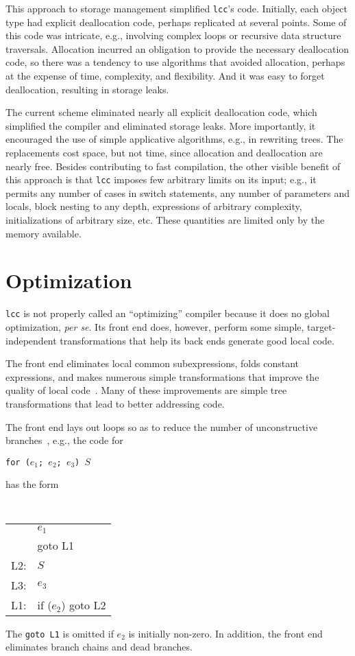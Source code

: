 This approach to storage management simplified \verb|lcc|'s code.
Initially, each object type had explicit deallocation code, perhaps
replicated at several points. Some of this code was intricate, e.g.,
involving complex loops or recursive data structure traversals.
Allocation incurred an obligation to provide the necessary
deallocation code, so there was a tendency to use
algorithms that avoided allocation,
perhaps at the expense of time, complexity, and flexibility.
And it was easy to forget deallocation, resulting in storage leaks.

The current scheme eliminated nearly all explicit deallocation code,
which simplified the compiler and eliminated storage leaks.
More importantly, it encouraged the use of simple applicative algorithms,
e.g., in rewriting trees.
The replacements cost space, but not time, since
allocation and deallocation are nearly free.
Besides contributing to fast compilation, the other visible
benefit of this approach is that \verb|lcc| imposes few
arbitrary limits on its input; e.g., it permits
any number of cases in switch statements,
any number of parameters and locals, block nesting to any depth,
expressions of arbitrary complexity, initializations of arbitrary size, etc.
These quantities are limited only by the memory available.


\section{Optimization}

\verb|lcc| is not properly called an ``optimizing'' compiler
because it does no global optimization, {\em per se}.
Its front end does, however, perform some simple, target-independent
transformations that help its back ends generate good local code.

The front end eliminates local common subexpressions,
folds constant expressions, and makes numerous simple
transformations that improve the quality of local code~\cite{hanson83}.
Many of these improvements are simple tree transformations
that lead to better addressing code.

The front end lays out loops so as to reduce the number
of unconstructive branches~\cite{baskett78}, e.g., the code for
\begin{flushleft}
\tt for ($e_1$; $e_2$; $e_3$) $S$
\end{flushleft}
has the form
\begin{flushleft}\tt
\begin{tabular}{ll}
	& $e_1$ \\
	& goto L1 \\
L2:	& $S$ \\
L3:	& $e_3$ \\
L1:	& if ($e_2$) goto L2 \\
\end{tabular}
\end{flushleft}
The \verb|goto L1| is omitted if $e_2$ is initially non-zero.
In addition, the front end eliminates branch chains and dead branches.


